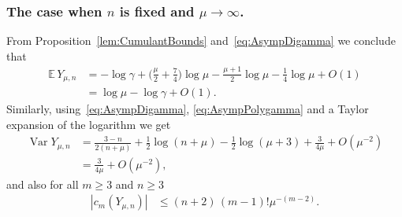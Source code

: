 \documentclass[10pt]{amsart}
\theoremstyle{definition}\newtheorem{defi}[theo]{Definition}\newtheorem{rema}[theo]{Remark}\newtheorem{exam}[theo]{Example}\newtheorem{exem}[theo]{Example}\newtheorem{nota}[theo]{Notation}
\newcommand{\EE}{\mathbb{E}\,}
\newcommand{\Var}{\mathop{\mathrm{Var}}\nolimits}
\begin{document}
\subsubsection{The case when $n$ is fixed and $\mu\rightarrow \infty$.}
From Proposition~\ref{lem:CumulantBounds} and~\eqref{eq:AsympDigamma} we conclude that
\begin{align*}
\EE Y_{\mu,n}&=-\log\gamma+\Big(\frac{\mu}{2}+\frac{7}{4}\Big)\log \mu-\frac{\mu+1}{2}\log \mu-\frac{1}{4}\log \mu+O(1)\\
&= \log \mu-\log\gamma+O(1).
\end{align*}
Similarly, using~\eqref{eq:AsympDigamma}, \eqref{eq:AsympPolygamma} and a Taylor expansion of the logarithm we get
\begin{align*}
\Var Y_{\mu,n}&=\frac{3-n}{2(n+\mu)}+\frac12\log(n+\mu)-\frac12\log(\mu+3)+\frac{3}{4\mu}+O\left(\mu^{-2}\right)\\
&=\frac{3}{4\mu}+O\left(\mu^{-2}\right),
\end{align*}
and also for all $m\geq 3$ and $n\geq 3$
\begin{align*}
|c_m(Y_{\mu,n})|&\leq (n+2)\,(m-1)!\mu^{-(m-2)}.
\end{align*}
\end{document}
